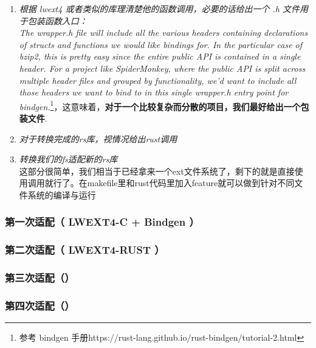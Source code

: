 \begin{enumerate}
    \item \textit{根据 lwext4 或者类似的库理清楚他的函数调用，必要的话给出一个 .h 文件用于包装函数入口：} \\ \textit{The wrapper.h file will include all the various headers containing declarations of structs and functions we would like bindings for. In the particular case of bzip2, this is pretty easy since the entire public API is contained in a single header. For a project like SpiderMonkey, where the public API is split across multiple header files and grouped by functionality, we'd want to include all those headers we want to bind to in this single wrapper.h entry point for bindgen.}\footnote{参考 bindgen 手册https://rust-lang.github.io/rust-bindgen/tutorial-2.html}，这意味着，\textbf{对于一个比较复杂而分散的项目，我们最好给出一个包装文件}.
    \item \textit{对于转换完成的rs库，视情况给出rust调用}
    \item \textit{转换我们的fs适配新的rs库} \\ 这部分很简单，我们相当于已经拿来一个ext文件系统了，剩下的就是直接使用调用就行了。在makefile里和rust代码里加入feature就可以做到针对不同文件系统的编译与运行
\end{enumerate}

\subsubsection{第一次适配（ LWEXT4-C + Bindgen ）}

\subsubsection{第二次适配（ LWEXT4-RUST ）}

\subsubsection{第三次适配（）}

\subsubsection{第四次适配（）}